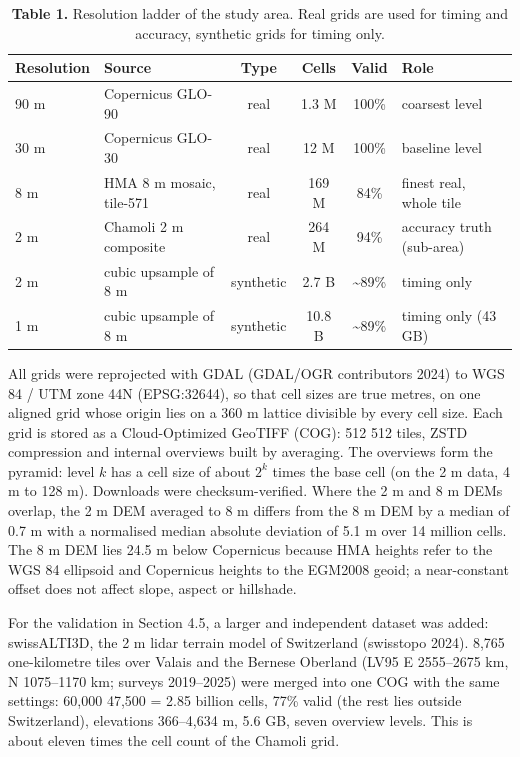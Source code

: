 \documentclass[10pt,a4paper]{article}
\begin{document}
\begin{table}[H]
\centering\small
\caption*{\textbf{Table 1.} Resolution ladder of the study area. Real grids are used for timing and accuracy, synthetic grids for timing only.}
\begin{tabularx}{\linewidth}{l>{\centering\arraybackslash}Xccc>{\centering\arraybackslash}X}
\toprule
\textbf{Resolution} & \textbf{Source} & \textbf{Type} & \textbf{Cells} & \textbf{Valid} & \textbf{Role} \\
\midrule
90 m & Copernicus GLO-90 & real & 1.3 M & 100\% & coarsest level \\
30 m & Copernicus GLO-30 & real & 12 M & 100\% & baseline level \\
8 m & HMA 8 m mosaic, tile-571 & real & 169 M & 84\% & finest real, whole tile \\
2 m & Chamoli 2 m composite & real & 264 M & 94\% & accuracy truth (sub-area) \\
2 m & cubic upsample of 8 m & synthetic & 2.7 B & \textasciitilde{}89\% & timing only \\
1 m & cubic upsample of 8 m & synthetic & 10.8 B & \textasciitilde{}89\% & timing only (43 GB) \\
\bottomrule
\end{tabularx}
\end{table}
All grids were reprojected with GDAL (GDAL/OGR contributors 2024) to WGS 84 / UTM zone 44N (EPSG:32644), so that cell sizes are true metres, on one aligned grid whose origin lies on a 360 m lattice divisible by every cell size. Each grid is stored as a Cloud-Optimized GeoTIFF (COG): 512 \texttimes{} 512 tiles, ZSTD compression and internal overviews built by averaging. The overviews form the pyramid: level $k$ has a cell size of about $2^{k}$ times the base cell (on the 2 m data, 4 m to 128 m). Downloads were checksum-verified. Where the 2 m and 8 m DEMs overlap, the 2 m DEM averaged to 8 m differs from the 8 m DEM by a median of \textminus{}0.7 m with a normalised median absolute deviation of 5.1 m over 14 million cells. The 8 m DEM lies 24.5 m below Copernicus because HMA heights refer to the WGS 84 ellipsoid and Copernicus heights to the EGM2008 geoid; a near-constant offset does not affect slope, aspect or hillshade.

For the validation in Section 4.5, a larger and independent dataset was added: swissALTI3D, the 2 m lidar terrain model of Switzerland (swisstopo 2024). 8,765 one-kilometre tiles over Valais and the Bernese Oberland (LV95 E 2555--2675 km, N 1075--1170 km; surveys 2019--2025) were merged into one COG with the same settings: 60,000 \texttimes{} 47,500 = 2.85 billion cells, 77\% valid (the rest lies outside Switzerland), elevations 366--4,634 m, 5.6 GB, seven overview levels. This is about eleven times the cell count of the Chamoli grid.
\end{document}
